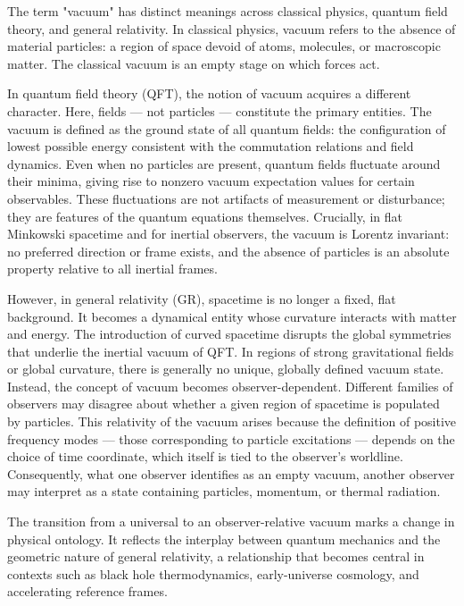 The term "vacuum" has distinct meanings across classical physics, quantum field theory, and general relativity. In classical physics, vacuum refers to the absence of material particles: a region of space devoid of atoms, molecules, or macroscopic matter. The classical vacuum is an empty stage on which forces act.

In quantum field theory (QFT), the notion of vacuum acquires a different character. Here, fields — not particles — constitute the primary entities. The vacuum is defined as the ground state of all quantum fields: the configuration of lowest possible energy consistent with the commutation relations and field dynamics. Even when no particles are present, quantum fields fluctuate around their minima, giving rise to nonzero vacuum expectation values for certain observables. These fluctuations are not artifacts of measurement or disturbance; they are features of the quantum equations themselves. Crucially, in flat Minkowski spacetime and for inertial observers, the vacuum is Lorentz invariant: no preferred direction or frame exists, and the absence of particles is an absolute property relative to all inertial frames.

However, in general relativity (GR), spacetime is no longer a fixed, flat background. It becomes a dynamical entity whose curvature interacts with matter and energy. The introduction of curved spacetime disrupts the global symmetries that underlie the inertial vacuum of QFT. In regions of strong gravitational fields or global curvature, there is generally no unique, globally defined vacuum state. Instead, the concept of vacuum becomes observer-dependent. Different families of observers may disagree about whether a given region of spacetime is populated by particles. This relativity of the vacuum arises because the definition of positive frequency modes — those corresponding to particle excitations — depends on the choice of time coordinate, which itself is tied to the observer's worldline. Consequently, what one observer identifies as an empty vacuum, another observer may interpret as a state containing particles, momentum, or thermal radiation.

The transition from a universal to an observer-relative vacuum marks a change in physical ontology. It reflects the interplay between quantum mechanics and the geometric nature of general relativity, a relationship that becomes central in contexts such as black hole thermodynamics, early-universe cosmology, and accelerating reference frames.

